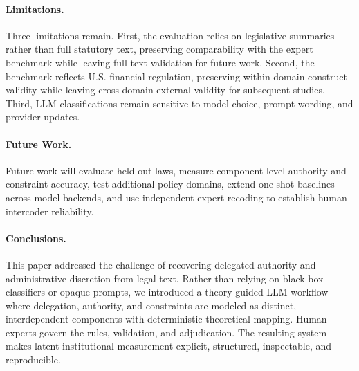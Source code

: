 \documentclass[runningheads]{llncs}
\begin{document}
\paragraph{Limitations.} Three limitations remain. First, the evaluation relies on legislative summaries rather than full statutory text, preserving comparability with the expert benchmark while leaving full-text validation for future work. Second, the benchmark reflects U.S. financial regulation, preserving within-domain construct validity while leaving cross-domain external validity for subsequent studies. Third, LLM classifications remain sensitive to model choice, prompt wording, and provider updates.

\paragraph{Future Work.} Future work will evaluate held-out laws, measure component-level authority and constraint accuracy, test additional policy domains, extend one-shot baselines across model backends, and use independent expert recoding to establish human intercoder reliability.

\paragraph{Conclusions.} This paper addressed the challenge of recovering delegated authority and administrative discretion from legal text. Rather than relying on black-box classifiers or opaque prompts, we introduced a theory-guided LLM workflow where delegation, authority, and constraints are modeled as distinct, interdependent components with deterministic theoretical mapping. Human experts govern the rules, validation, and adjudication. The resulting system makes latent institutional measurement explicit, structured, inspectable, and reproducible.


\vspace{-0.4cm}

\end{document}
